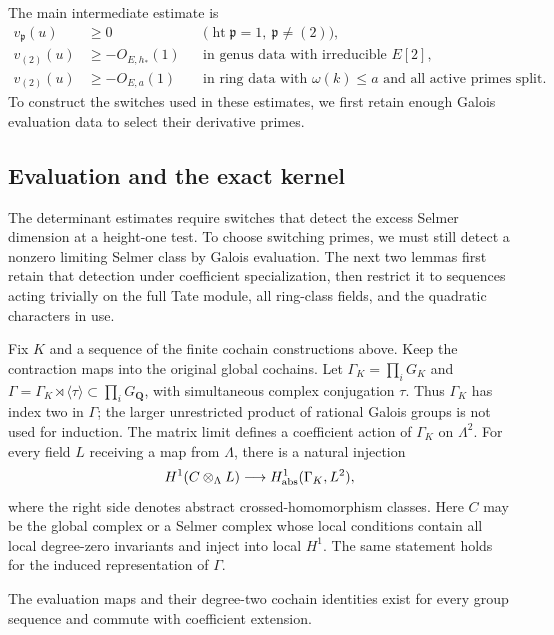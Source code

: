 The main intermediate estimate is
\begin{equation}\label{eq:h:divisor-bounds}
 \begin{aligned}
 v_{\mathfrak p}(u)&\ge0
       &&\bigl(\operatorname{ht}\mathfrak p=1,
                         \ \mathfrak p\ne(2)\bigr),\\
 v_{(2)}(u)&\ge-O_{E,h_*}(1)
       &&\text{in genus data with irreducible }E[2],\\
 v_{(2)}(u)&\ge-O_{E,a}(1)
       &&\text{in ring data with }\omega(k)\le a
                         \text{ and all active primes split.}
 \end{aligned}
\end{equation}
To construct the switches used in these estimates, we first retain
enough Galois evaluation data to select their derivative primes.

\subsection{Evaluation and the exact kernel}

The determinant estimates require switches that detect the excess
Selmer dimension at a height-one test. To choose
switching primes, we must still detect a nonzero limiting Selmer class
by Galois evaluation. The next two lemmas first retain that detection
under coefficient specialization, then restrict it to sequences acting
trivially on the full Tate module, all ring-class fields, and the
quadratic characters in use.

\begin{lemma}\label{rl:evaluation}
\label{lem:h:evaluation}
Fix $K$ and a sequence of the finite cochain constructions above.  Keep
the contraction maps into the original global cochains.  Let
$\Gamma_K=\prod_i G_K$ and
$\Gamma=\Gamma_K\rtimes\langle\tau\rangle\subset\prod_iG_{\mathbf Q}$,
with simultaneous complex conjugation $\tau$.  Thus $\Gamma_K$ has
index two in $\Gamma$; the larger unrestricted product of rational
Galois groups is not used for induction.  The matrix limit defines a
coefficient action of $\Gamma_K$ on $\Lambda^2$.  For every field $L$
receiving a map from $\Lambda$, there is a natural injection
\[
 H^1(C\otimes_\Lambda L)\longrightarrow
 H^1_{\rm abs}(\Gamma_K,L^2),
\]
where the right side denotes abstract crossed-homomorphism classes.
Here $C$ may be the global complex or a Selmer complex whose local
conditions contain all local degree-zero invariants and inject into
local $H^1$.  The same statement holds for the induced representation
of $\Gamma$.

The evaluation maps and their degree-two cochain identities exist
for every group sequence and commute with coefficient extension.
\end{lemma}

